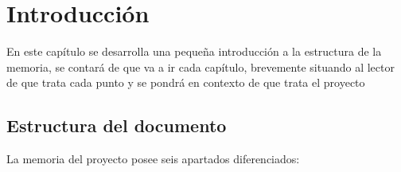 \documentclass[12pt,twoside,titlepage]{report}
\begin{document}
\chapter{Introducción}



\pagestyle{fancy}


\setlength{\parskip}{0.75em}
\renewcommand{\baselinestretch}{1.25}
\setcounter{page}{1}


En este capítulo se desarrolla una pequeña introducción a la estructura de la memoria, se contará de que va a ir cada capítulo, brevemente situando al lector de que trata cada punto y se pondrá en contexto de que trata el proyecto 

\section{Estructura del documento}

La memoria del proyecto posee seis apartados diferenciados:
\end{document}
